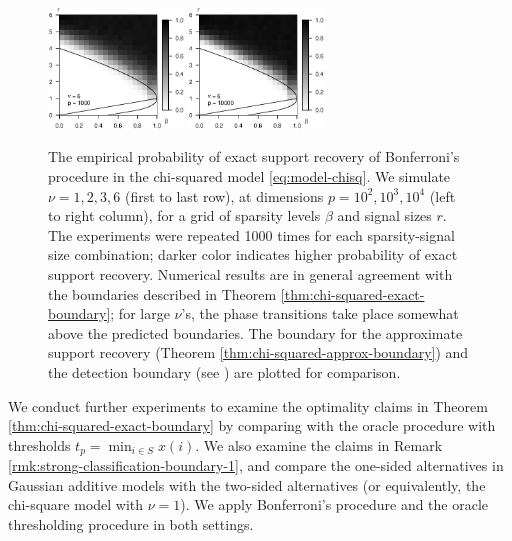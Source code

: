 \begin{figure}
      \includegraphics[width=0.32\textwidth]{sim_strong_boundary/simulated_phase_diagram_chi-squared_nu6_p1000.eps}
      \includegraphics[width=0.32\textwidth]{sim_strong_boundary/simulated_phase_diagram_chi-squared_nu6_p10000.eps}
      \caption{The empirical probability of exact support recovery of Bonferroni's procedure in the chi-squared model \eqref{eq:model-chisq}. 
      We simulate $\nu=1, 2, 3, 6$ (first to last row), at dimensions $p=10^2, 10^3, 10^4$ (left to right column), for a grid of sparsity levels $\beta$ and signal sizes $r$.
      The experiments were repeated 1000 times for each sparsity-signal size combination; darker color indicates higher probability of exact support recovery.  
      Numerical results are in general agreement with the boundaries described in Theorem \ref{thm:chi-squared-exact-boundary}; for large $\nu$'s, the phase transitions take place somewhat above the predicted boundaries.
      The boundary for the approximate support recovery (Theorem \ref{thm:chi-squared-approx-boundary}) and the detection boundary (see \citep{donoho2004higher}) are plotted for comparison.} 
      \label{fig:phase-simulated-chi-squared}
\end{figure}

We conduct further experiments to examine the optimality claims in Theorem \ref{thm:chi-squared-exact-boundary} by comparing with the oracle procedure with thresholds $t_p=\min_{i\in S}x(i)$.
We also examine the claims in Remark \ref{rmk:strong-classification-boundary-1}, and compare the one-sided alternatives in Gaussian additive models with the two-sided alternatives (or equivalently, the chi-square model with $\nu=1$).
We apply Bonferroni's procedure and the oracle thresholding procedure in both settings.

